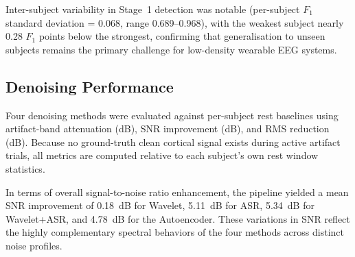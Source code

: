\documentclass[11pt,a4paper]{article}
\begin{document}
Inter-subject variability in Stage~1 detection was notable (per-subject $F_1$ standard deviation = 0.068, range 0.689--0.968), with the weakest subject nearly 0.28 $F_1$ points below the strongest, confirming that generalisation to unseen subjects remains the primary challenge for low-density wearable EEG systems.

\subsection{Denoising Performance}
\label{sec:denoising_results}
Four denoising methods were evaluated against per-subject rest baselines using artifact-band attenuation (dB), SNR improvement (dB), and RMS reduction (dB). Because no ground-truth clean cortical signal exists during active artifact trials, all metrics are computed relative to each subject's own rest window statistics.

\begin{table}[H]
\centering
\caption{Artifact-band attenuation (dB) per method and artifact class. Artifact band: 0.5--8~Hz for ocular and head movement classes; 30--99~Hz for clench. Negative values (italicised) indicate increased power. Bold marks the best result per class.}
\label{tab:denoising_metrics}
\end{table}


In terms of overall signal-to-noise ratio enhancement, the pipeline yielded a mean SNR improvement of 0.18~dB for Wavelet, 5.11~dB for ASR, 5.34~dB for Wavelet+ASR, and 4.78~dB for the Autoencoder. These variations in SNR reflect the highly complementary spectral behaviors of the four methods across distinct noise profiles.
\end{document}
